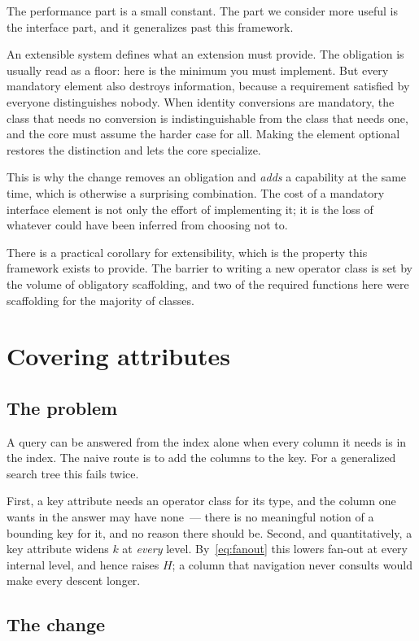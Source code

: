 The performance part is a small constant. The part we consider more useful is the
interface part, and it generalizes past this framework.

An extensible system defines what an extension must provide. The obligation is
usually read as a floor: here is the minimum you must implement. But every
mandatory element also destroys information, because a requirement satisfied by
everyone distinguishes nobody. When identity conversions are mandatory, the class
that needs no conversion is indistinguishable from the class that needs one, and
the core must assume the harder case for all. Making the element optional
restores the distinction and lets the core specialize.

This is why the change removes an obligation and \emph{adds} a capability at the
same time, which is otherwise a surprising combination. The cost of a mandatory
interface element is not only the effort of implementing it; it is the loss of
whatever could have been inferred from choosing not to.

There is a practical corollary for extensibility, which is the property this
framework exists to provide. The barrier to writing a new operator class is set
by the volume of obligatory scaffolding, and two of the required functions here
were scaffolding for the majority of classes.

\section{Covering attributes}
\label{sec:include}

\subsection{The problem}

A query can be answered from the index alone when every column it needs is in the
index. The naive route is to add the columns to the key. For a generalized search
tree this fails twice.

First, a key attribute needs an operator class for its type, and the column one
wants in the answer may have none~--- there is no meaningful notion of a
bounding key for it, and no reason there should be. Second, and quantitatively,
a key attribute widens $k$ at \emph{every} level. By~\eqref{eq:fanout} this
lowers fan-out at every internal level, and hence raises $H$; a column that
navigation never consults would make every descent longer.

\subsection{The change}

